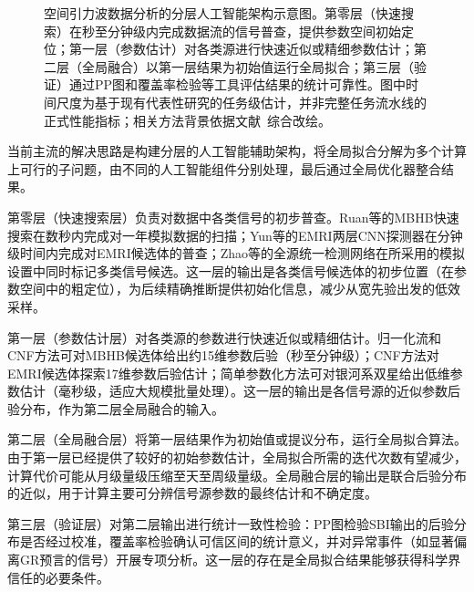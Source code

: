 \begin{figure}[htbp]
{}
\caption{空间引力波数据分析的分层人工智能架构示意图。第零层（快速搜索）在秒至分钟级内完成数据流的信号普查，提供参数空间初始定位；第一层（参数估计）对各类源进行快速近似或精细参数估计；第二层（全局融合）以第一层结果为初始值运行全局拟合；第三层（验证）通过PP图和覆盖率检验等工具评估结果的统计可靠性。图中时间尺度为基于现有代表性研究的任务级估计，并非完整任务流水线的正式性能指标；相关方法背景依据文献~\cite{ruan2023mbhb,zhao2023spacegw,liang2026sbireview,wang2024challenges,du2026taiji}综合改绘。}
\label{fig:global_fit_layers}
\end{figure}

当前主流的解决思路是构建分层的人工智能辅助架构，将全局拟合分解为多个计算上可行的子问题，由不同的人工智能组件分别处理，最后通过全局优化器整合结果。

第零层（快速搜索层）负责对数据中各类信号的初步普查。Ruan等的MBHB快速搜索在数秒内完成对一年模拟数据的扫描；Yun等的EMRI两层CNN探测器在分钟级时间内完成对EMRI候选体的普查；Zhao等的全源统一检测网络在所采用的模拟设置中同时标记多类信号候选。这一层的输出是各类信号候选体的初步位置（在参数空间中的粗定位），为后续精确推断提供初始化信息，减少从宽先验出发的低效采样。

第一层（参数估计层）对各类源的参数进行快速近似或精细估计。归一化流和CNF方法可对MBHB候选体给出约15维参数后验（秒至分钟级）；CNF方法对EMRI候选体探索17维参数后验估计；简单参数化方法可对银河系双星给出低维参数估计（毫秒级，适应大规模批量处理）。这一层的输出是各信号源的近似参数后验分布，作为第二层全局融合的输入。

第二层（全局融合层）将第一层结果作为初始值或提议分布，运行全局拟合算法。由于第一层已经提供了较好的初始参数估计，全局拟合所需的迭代次数有望减少，计算代价可能从月级量级压缩至天至周级量级。全局融合层的输出是联合后验分布的近似，用于计算主要可分辨信号源参数的最终估计和不确定度。

第三层（验证层）对第二层输出进行统计一致性检验：PP图检验SBI输出的后验分布是否经过校准，覆盖率检验确认可信区间的统计意义，并对异常事件（如显著偏离GR预言的信号）开展专项分析。这一层的存在是全局拟合结果能够获得科学界信任的必要条件。

